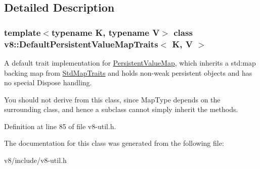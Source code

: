 \subsection{Detailed Description}
\subsubsection*{template$<$typename K, typename V$>$\newline
class v8\+::\+Default\+Persistent\+Value\+Map\+Traits$<$ K, V $>$}

A default trait implementation for \mbox{\hyperlink{classv8_1_1PersistentValueMap}{Persistent\+Value\+Map}}, which inherits a std\+:map backing map from \mbox{\hyperlink{classv8_1_1StdMapTraits}{Std\+Map\+Traits}} and holds non-\/weak persistent objects and has no special Dispose handling.

You should not derive from this class, since Map\+Type depends on the surrounding class, and hence a subclass cannot simply inherit the methods. 

Definition at line 85 of file v8-\/util.\+h.



The documentation for this class was generated from the following file\+:\begin{DoxyCompactItemize}
\item 
v8/include/v8-\/util.\+h\end{DoxyCompactItemize}

